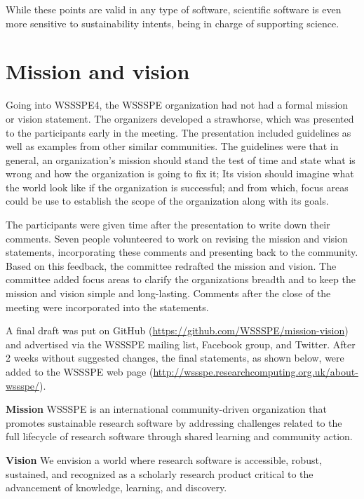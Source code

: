 \documentclass[11pt, oneside]{amsart}
\newcommand{\note}[1]{ {\textcolor{blueish}    { ***Note:      #1 }}}
\begin{document}
While these points are valid in any type of software, scientific software is even more sensitive to sustainability intents, being in charge of supporting science.


\section{Mission and vision}\label{sec:mission}


Going into WSSSPE4, the WSSSPE organization had not had a formal mission or vision statement.
The organizers developed a strawhorse, which was presented to the participants early in the meeting.
The presentation included guidelines as well as examples from other similar communities.
The guidelines were that in general, an organization's mission should stand the test of time and state what is wrong and how the organization is going to fix it; Its vision should imagine what the world look like if the organization is successful; and from which, focus areas could be use to establish the scope of the organization along with its goals.

The participants were given time after the presentation to write down their comments.
Seven people volunteered to work on revising the mission and vision statements, incorporating these comments and presenting back to the community.
Based on this feedback, the committee redrafted the mission and vision.
The committee added focus areas to clarify the organizations breadth and to keep the mission and vision simple and long-lasting.
Comments after the close of the meeting were incorporated into the statements.

A final draft was put on GitHub (\url{https://github.com/WSSSPE/mission-vision}) and advertised
via the WSSSPE mailing list, Facebook group, and Twitter.
After 2 weeks without suggested changes, the final statements, as shown below, were added
to the WSSSPE web page (\url{http://wssspe.researchcomputing.org.uk/about-wssspe/}).

{\bf Mission}
WSSSPE is an international community-driven organization that promotes sustainable research software by addressing challenges related to the full lifecycle of research software through shared learning and community action.

{\bf Vision}
We envision a world where research software is accessible, robust, sustained, and recognized as a scholarly research product critical to the advancement of knowledge, learning, and discovery.
\end{document}

